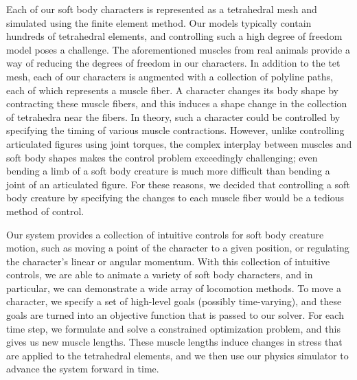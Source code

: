 Each of our soft body characters is represented as a tetrahedral mesh and
simulated using the finite element method. Our models typically contain
hundreds of tetrahedral elements, and controlling such a high degree of
freedom model poses a challenge.  The aforementioned muscles from real
animals provide a way of reducing the degrees of freedom in our
characters.  In addition to the tet mesh, each of our characters is
augmented with a collection of polyline paths, each of which represents a
muscle fiber.  A character changes its body shape by contracting these
muscle fibers, and this induces a shape change in the collection of tetrahedra
near the fibers. In theory, such a character could be controlled by
specifying the timing of various muscle contractions. However, unlike
controlling articulated figures using joint torques, the complex interplay
between muscles and soft body shapes makes the control problem exceedingly
challenging; even bending a limb of a soft body creature is much more
difficult than bending a joint of an articulated figure. For these
reasons, we decided that controlling a soft body creature by specifying
the changes to each muscle fiber would be a tedious method of control.

Our system provides a collection of intuitive controls for soft body
creature motion, such as moving a point of the character to a given
position, or regulating the character's linear or angular momentum. With this
collection of intuitive controls, we are able to animate a variety of
soft body characters, and in particular, we can demonstrate a wide array
of locomotion methods.  To move a character, we specify a set of
high-level goals (possibly time-varying), and these goals are turned into
an objective function that is passed to our solver.  For each time
step, we formulate and solve a constrained optimization problem, and this
gives us new muscle lengths.  These muscle lengths induce changes in
stress that are applied to the tetrahedral elements, and we then use our
physics simulator to advance the system forward in time.

